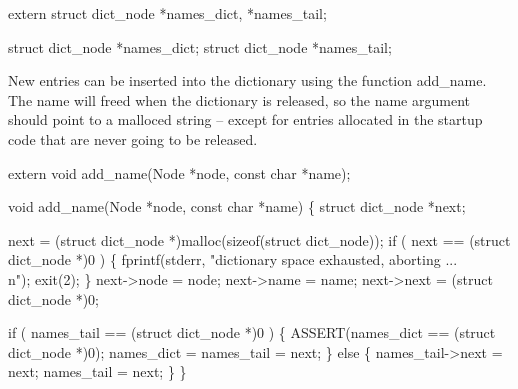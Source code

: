 extern struct dict_node *names_dict, *names_tail;

\nwendcode{}\nwdocspar
\nwenddocs{}\plusendmoddef\nwstartdeflinemarkup{}\nwenddeflinemarkup
struct dict_node *names_dict;
struct dict_node *names_tail;

\nwendcode{}\nwdocspar
New entries can be inserted into the dictionary using the function
{\Tt{}add{\_}name\nwendquote}. The name will {\Tt{}free\nwendquote}d when the dictionary is released,
so the {\Tt{}name\nwendquote} argument should point to a {\Tt{}malloc\nwendquote}ed string --
except for entries allocated in the startup code that are never going
to be released.

\nwenddocs{}\plusendmoddef\nwstartdeflinemarkup{}\nwenddeflinemarkup
extern void add_name(Node *node, const char *name);

\nwendcode{}\nwdocspar
\nwenddocs{}\plusendmoddef\nwstartdeflinemarkup{}\nwenddeflinemarkup
void
add_name(Node *node, const char *name)
\{
    struct dict_node *next;

    next = (struct dict_node *)malloc(sizeof(struct dict_node));
    if ( next == (struct dict_node *)0 )
    \{
        fprintf(stderr, "dictionary space exhausted, aborting ...\\n");
        exit(2);
    \}
    next->node = node;
    next->name = name;
    next->next = (struct dict_node *)0;

    if ( names_tail == (struct dict_node *)0 )
    \{
        ASSERT(names_dict == (struct dict_node *)0);
        names_dict = names_tail = next;
    \}
    else
    \{
        names_tail->next = next;
        names_tail       = next;
    \}
\}

